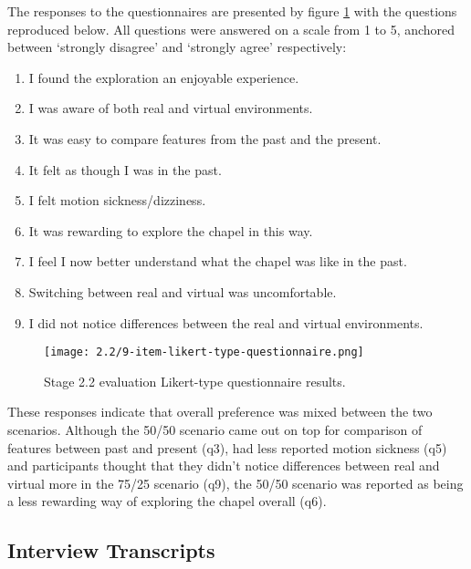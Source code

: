 The responses to the questionnaires are presented by figure \ref{9-item-likert-type-questionnaire.png} with the questions reproduced below. All questions were answered on a scale from 1 to 5, anchored between `strongly disagree' and `strongly agree' respectively:
\begin{enumerate}
	\item I found the exploration an enjoyable experience.
	\item I was aware of both real and virtual environments.
	\item It was easy to compare features from the past and the present.
	\item It felt as though I was in the past.
	\item I felt motion sickness/dizziness.
	\item It was rewarding to explore the chapel in this way.
	\item I feel I now better understand what the chapel was like in the past.
	\item Switching between real and virtual was uncomfortable.
	\item I did not notice differences between the real and virtual environments.
\end{enumerate}

\begin{figure}[h]
	\begin{center}
	\texttt{[image: 2.2/9-item-likert-type-questionnaire.png]}
	\caption{Stage 2.2 evaluation Likert-type questionnaire results.}
	\label{9-item-likert-type-questionnaire.png}
	\end{center}
\end{figure}

These responses indicate that overall preference was mixed between the two scenarios. Although the 50/50 scenario came out on top for comparison of features between past and present (q3), had less reported motion sickness (q5) and participants thought that they didn't notice differences between real and virtual more in the 75/25 scenario (q9), the 50/50 scenario was reported as being a less rewarding way of exploring the chapel overall (q6).


\subsection{Interview Transcripts}

